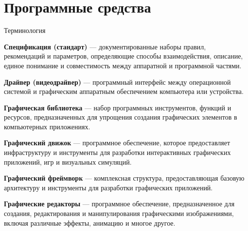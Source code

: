 \documentclass{beamer}
\begin{document}
\section{Программные средства}
\begin{frame}{Терминология}
	{\scriptsize
	
	\textbf{Спецификация (стандарт)} --- документированные наборы правил, рекомендаций и параметров, определяющие способы взаимодействия, описание, единое понимание и совместимость между аппаратной и программной частями.
	
	\textbf{Драйвер (видеодрайвер)} --- программный интерфейс между операционной системой и графическим аппаратным обеспечением компьютера или устройства. 
	
	\textbf{Графическая библиотека} --- набор программных инструментов, функций и ресурсов, предназначенных для упрощения создания графических элементов в компьютерных приложениях. 
	
	\textbf{Графический движок} --- программное обеспечение, которое предоставляет инфраструктуру и инструменты для разработки интерактивных графических приложений, игр и визуальных симуляций. 
	
	\textbf{Графический фреймворк} --- комплексная структура, предоставляющая базовую архитектуру и инструменты для разработки графических приложений. 
	
	\textbf{Графические редакторы} --- программное обеспечение, предназначенное для создания, редактирования и манипулирования графическими изображениями, включая различные эффекты, анимацию и многое другое. 
	
}
\end{frame}
\end{document}
